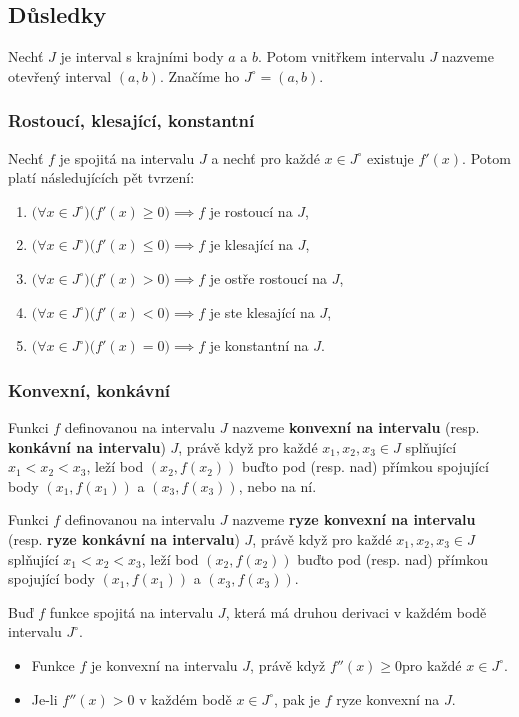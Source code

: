 \documentclass{szzclass}
\begin{document}
\subsection{Důsledky}
Nechť $J$ je interval s krajními body $a$ a $b$.
Potom vnitřkem intervalu $J$ nazveme otevřený
interval $(a,b)$. Značíme ho $J^\circ=(a,b)$.


\subsubsection{Rostoucí, klesající, konstantní}
Nechť $f$ je spojitá na intervalu $J$ a nechť pro
každé $x\in J^\circ$ existuje $f'(x)$. Potom platí
následujících pět tvrzení:
\begin{enumerate}
    \item $\big(\forall x\in J^\circ\big)\big(f'(x) \geq 0\big) \implies f$ je rostoucí  na $J$,
    \item $\big(\forall x\in J^\circ\big)\big(f'(x) \leq 0\big) \implies f$ je klesající na $J$,
    \item $\big(\forall x\in J^\circ\big)\big(f'(x) > 0\big) \implies f$ je ostře rostoucí  na $J$,
    \item $\big(\forall x\in J^\circ\big)\big(f'(x) < 0\big) \implies f$ je ste klesající na $J$,
    \item $\big(\forall x\in J^\circ\big)\big(f'(x) = 0\big) \implies f$ je konstantní na $J$.
\end{enumerate}



\subsubsection{Konvexní, konkávní}
Funkci $f$ definovanou na intervalu $J$ nazveme \textbf{konvexní na intervalu}
(resp. \textbf{konkávní na intervalu}) $J$, právě když pro každé $x_1,x_2,x_3 \in J$
splňující $x_1<x_2<x_3$, leží bod $(x_2,f(x_2))$ buďto pod (resp. nad) přímkou
spojující body $(x_1,f(x_1))$ a $(x_3,f(x_3))$, nebo na ní.

Funkci $f$ definovanou na intervalu $J$ nazveme \textbf{ryze konvexní na intervalu}
(resp. \textbf{ryze konkávní na intervalu}) $J$, právě když pro každé $x_1,x_2,x_3 \in J$
splňující $x_1<x_2<x_3$, leží bod $(x_2,f(x_2))$ buďto pod (resp. nad) přímkou
spojující body $(x_1,f(x_1))$ a $(x_3,f(x_3))$.

Buď $f$ funkce spojitá na intervalu $J$, která má druhou derivaci v každém bodě intervalu $J^\circ$.
\begin{itemize}
    \item Funkce $f$ je konvexní na intervalu $J$, právě když $f''(x)\geq0$pro každé $x\in J^\circ$.
    \item Je-li $f''(x)>0$ v každém bodě $x\in J^\circ$, pak je $f$ ryze konvexní na $J$.
\end{itemize}
\end{document}
